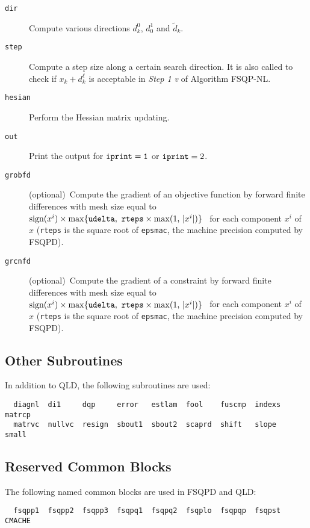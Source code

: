 \begin{description}
\item[\tt dir] Compute various directions $d_k^0$, $d^1_0$ and $\tilde d_k$.
\item[\tt step]Compute a step size along a certain search direction. 
               It is also called to check if $x_k+d_k^\ell$ is acceptable 
               in {\it Step 1 v} of Algorithm FSQP-NL.
\item[\tt hesian] Perform the Hessian matrix updating.
\item[\tt out] Print the output for ${\tt iprint=1}$ 
                  or ${\tt iprint}=2$.
\item[\tt grobfd] (optional)~Compute the gradient of an objective 
                function 
                by forward finite differences with mesh size equal to 
$\mbox{sign}(x^i)\times\max \{{\tt udelta},~
               {\tt rteps}\times\max (1,\,|x^i|)\}$~
                for each component $x^i$ of $x$ ({\tt rteps} is the 
                square root of {\tt epsmac}, the machine 
                precision computed by FSQPD).
\item[\tt grcnfd]  (optional)~Compute the gradient of a constraint by 
                   forward finite differences with mesh size equal to 
$\mbox{sign}(x^i)\times\max \{{\tt udelta},~
                {\tt rteps}\times\max (1,\,|x^i|)\}$~
                for each component $x^i$ of $x$ ({\tt rteps} is the 
                square root of {\tt epsmac}, the machine 
                precision computed by FSQPD).
\end{description}

\subsection{Other Subroutines}
\label{othsub}
In addition to QLD, the following subroutines are used:
\begin{verbatim}
  diagnl  di1     dqp     error   estlam  fool    fuscmp  indexs  matrcp
  matrvc  nullvc  resign  sbout1  sbout2  scaprd  shift   slope   small
\end{verbatim}

\subsection{Reserved Common Blocks}
\label{reserved}
The following named common blocks are used in FSQPD and QLD:
\begin{verbatim}
  fsqpp1  fsqpp2  fsqpp3  fsqpq1  fsqpq2  fsqplo  fsqpqp  fsqpst  CMACHE
\end{verbatim}


